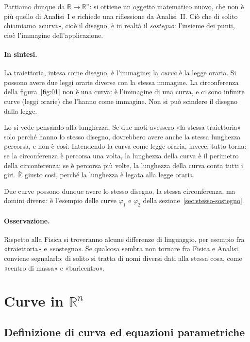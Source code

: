 Partiamo dunque da $\mathbb{R}\to\mathbb{R}^n$: si ottiene un oggetto matematico nuovo,
che non è più quello di Analisi~I e richiede una riflessione da Analisi~II.
Ciò che di solito chiamiamo «curva», cioè il disegno, è in realtà il \emph{sostegno}:
l'insieme dei punti, cioè l'immagine dell'applicazione.

\paragraph{In sintesi.} La traiettoria, intesa come disegno, è l'immagine; la
\emph{curva} è la legge oraria. Si possono avere due leggi orarie diverse con la stessa
immagine.
La circonferenza della figura~\ref{fig:01} non è una curva: è l'immagine di una curva,
e ci sono infinite curve (leggi orarie) che l'hanno come immagine.
Non si può scindere il disegno dalla legge.

Lo si vede pensando alla lunghezza. Se due moti avessero «la stessa traiettoria» solo
perché hanno lo stesso disegno, dovrebbero avere anche la stessa lunghezza percorsa, e
non è così.
Intendendo la curva come legge oraria, invece, tutto torna: se la circonferenza è
percorsa una volta, la lunghezza della curva è il perimetro della circonferenza; se è
percorsa più volte, la lunghezza della curva conta tutti i giri. È giusto così, perché
la lunghezza è legata alla legge oraria.

Due curve possono dunque avere lo stesso disegno, la stessa circonferenza, ma domini
diversi: è l'esempio delle curve $\varphi_1$ e $\varphi_2$ della
sezione~\ref{sec:stesso-sostegno}.

\paragraph{Osservazione.} Rispetto alla Fisica si troveranno alcune differenze di
linguaggio, per esempio fra «traiettoria» e «sostegno».
Se qualcosa sembra non tornare fra Fisica e Analisi, conviene segnalarlo: di solito si
tratta di nomi diversi dati alla stessa cosa, come «centro di massa» e «baricentro».

\section{Curve in $\mathbb{R}^n$}

\subsection{Definizione di curva ed equazioni parametriche}

